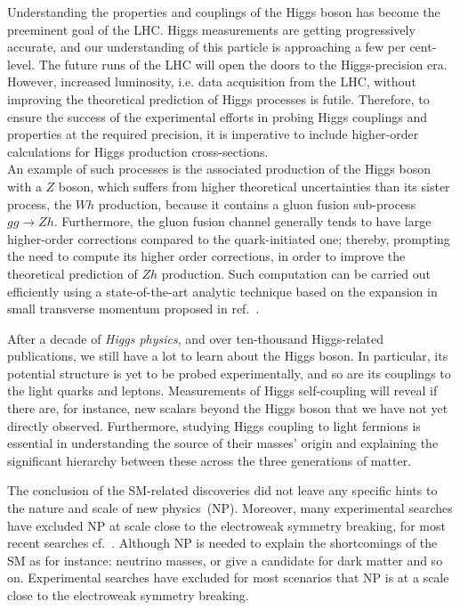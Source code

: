 \par Understanding the properties and couplings of the Higgs boson has become the preeminent goal of the LHC. Higgs measurements are getting progressively accurate, and our understanding of this particle is approaching a few per cent-level. The future runs of the LHC will open the doors to the Higgs-precision era. However, increased luminosity, i.e. data acquisition from the LHC, without improving the theoretical prediction of Higgs processes is futile. Therefore, to ensure the success of the experimental efforts in probing Higgs couplings and properties at the required precision, it is imperative to include higher-order calculations for Higgs production cross-sections. \\ 
An example of such processes is the associated production of the Higgs boson with a $Z$ boson, which suffers from higher theoretical uncertainties than its sister process, the $Wh$ production, because it contains a gluon fusion sub-process $ gg \to Zh$. Furthermore, the gluon fusion channel generally tends to have large higher-order corrections compared to the quark-initiated one;  thereby, prompting the need to compute its higher order corrections, in order to improve the theoretical prediction of  $Zh$ production. Such computation can be carried out efficiently using a state-of-the-art analytic technique based on the expansion in small transverse momentum proposed in ref.~\cite{Bonciani:2018omm}. 
%
 \par After a decade of \emph{Higgs physics}, and over ten-thousand Higgs-related publications, we still have a lot to learn about the Higgs boson.  In particular, its potential structure is yet to be probed experimentally, and so are its couplings to the light quarks and leptons. Measurements of Higgs self-coupling will reveal if there are, for instance, new scalars beyond the Higgs boson that we have not yet directly observed. Furthermore, studying Higgs coupling to light fermions is essential in understanding the source of their masses' origin and explaining the significant hierarchy between these across the three generations of matter. 
\par The conclusion of the SM-related discoveries did not leave any specific hints to the nature and scale of new physics~(NP).  Moreover, many experimental searches have excluded NP at scale close to the electroweak symmetry breaking, for most recent searches cf.~\cite{ATLAS-CONF-2022-006,ATLAS-CONF-2022-011,ATLAS-CONF-2022-012,ATLAS-CONF-2022-010,ATLAS-CONF-2022-009,CMS-PAS-EXO-20-011,CMS-PAS-EXO-21-010,CMS-PAS-EXO-21-003,CMS-PAS-EXO-20-006,CMS-PAS-EXO-21-006,CMS:2022nty,CMS:2022yjm}. Although NP is needed to explain the shortcomings of the SM as for instance: neutrino masses, or give a candidate for dark matter and so on. Experimental searches have excluded for most scenarios that NP is at a scale close to the electroweak symmetry breaking.

